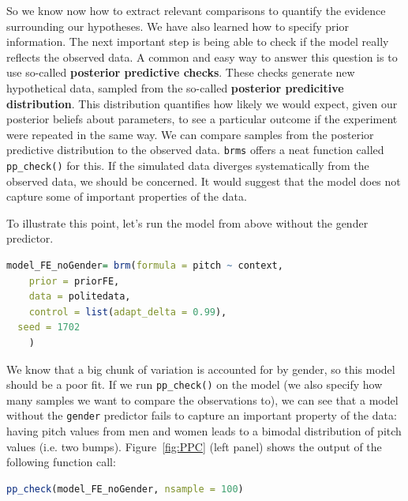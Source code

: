 \documentclass[nobib]{tufte-handout}
\begin{document}
So we know now how to extract relevant comparisons to quantify the evidence surrounding our hypotheses. We have also learned how to specify prior information. The next important step is being able to check if the model really reflects the observed data. A common and easy way to answer this question is to use so-called \textbf{posterior predictive checks}. These checks generate new hypothetical data, sampled from the so-called \textbf{posterior predicitive distribution}. This distribution quantifies how likely we would expect, given our posterior beliefs about parameters, to see a particular outcome if the experiment were repeated in the same way. We can compare samples from the posterior predictive distribution to the observed data. \texttt{brms} offers a neat function called \texttt{pp\_check()} for this. If the simulated data diverges systematically from the observed data, we should be concerned. It would suggest that the model does not capture some of important properties of the data. 

To illustrate this point, let's run the model from above without the gender predictor. 

\bigskip

\begin{minipage}[]{1\textwidth}
\begin{lstlisting}[language=R]
model_FE_noGender= brm(formula = pitch ~ context,
	prior = priorFE,
	data = politedata,
	control = list(adapt_delta = 0.99),
  seed = 1702
	)
\end{lstlisting}
\end{minipage}

We know that a big chunk of variation is accounted for by gender, so this model should be a
poor fit. If we run \texttt{pp\_check()} on the model (we also specify how many samples we want
to compare the observations to), we can see that a model without the \texttt{gender} predictor
fails to capture an important property of the data: having pitch values from men and women
leads to a bimodal distribution of pitch values (i.e. two bumps).
Figure~\ref{fig:PPC} (left panel) shows the output of the following function call:

\bigskip

\begin{minipage}[]{1\textwidth}
\begin{lstlisting}[language=R]
pp_check(model_FE_noGender, nsample = 100)
\end{lstlisting}
\end{minipage}
\end{document}
